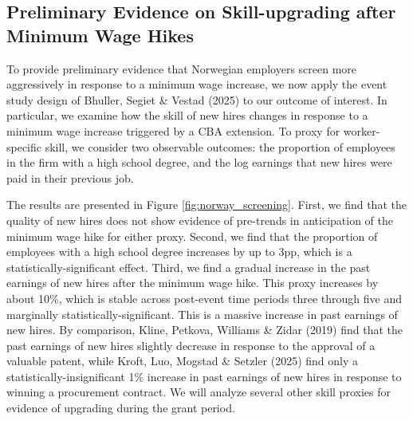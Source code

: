 \documentclass[11pt]{article}
\begin{document}

\subsection{Preliminary Evidence on Skill-upgrading after Minimum Wage Hikes}
 
To provide preliminary evidence that Norwegian employers screen more aggressively in response to a  minimum wage increase, we now apply the event study design of Bhuller, Segiet \& Vestad (2025) to our outcome of interest. In particular, we examine how the skill of new hires changes in response to a minimum wage increase triggered by a CBA extension. To proxy for worker-specific skill, we consider two observable outcomes: the proportion of employees in the firm with a high school degree, and the log earnings that new hires were paid in their previous job. 

The results are presented in Figure \ref{fig:norway_screening}. First, we find that the quality of new hires does not show evidence of pre-trends in anticipation of the minimum wage hike for either proxy. Second, we find that the proportion of employees with a high school degree increases by up to 3pp, which is a statistically-significant effect. Third, we find a gradual increase in the past earnings of new hires after the minimum wage hike. This proxy increases by about 10\%, which is stable across post-event time periods three through five and marginally statistically-significant. This is a massive increase in past earnings of new hires. By comparison, Kline, Petkova, Williams \& Zidar (2019) find that the past earnings of new hires slightly decrease in response to the approval of a valuable patent, while Kroft, Luo, Mogstad \& Setzler (2025) find only a statistically-insignificant 1\% increase in past earnings of new hires in response to winning a procurement contract. We will analyze several other skill proxies for evidence of upgrading during the grant period.
\end{document}
